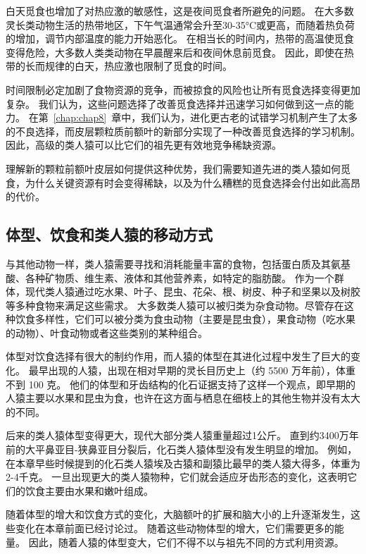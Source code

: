 白天觅食也增加了对热应激的敏感性，这是夜间觅食者所避免的问题。
在大多数灵长类动物生活的热带地区，下午气温通常会升至30-35°C或更高，而随着热负荷的增加，调节内部温度的能力开始恶化。
在相当长的时间内，热带的高温使觅食变得危险，大多数人类类动物在早晨醒来后和夜间休息前觅食\cite{jf1987food}。
因此，即使在热带的长而规律的白天，热应激也限制了觅食的时间。


时间限制必定加剧了食物资源的竞争，而被掠食的风险也让所有觅食选择变得更加复杂。
我们认为，这些问题选择了改善觅食选择并迅速学习如何做到这一点的能力。
在第~\ref{chap:chap8}~章中，我们认为，进化更古老的试错学习机制产生了太多的不良选择，而皮层颗粒质前额叶的新部分实现了一种改善觅食选择的学习机制。
因此，高级的类人猿可以比它们的祖先更有效地竞争稀缺资源。


理解新的颗粒前额叶皮层如何提供这种优势，我们需要知道先进的类人猿如何觅食，为什么关键资源有时会变得稀缺，以及为什么糟糕的觅食选择会付出如此高昂的代价。



\subsection{体型、饮食和类人猿的移动方式}

与其他动物一样，类人猿需要寻找和消耗能量丰富的食物，包括蛋白质及其氨基酸、各种矿物质、维生素、液体和其他营养素，如特定的脂肪酸。
作为一个群体，现代类人猿通过吃水果、叶子、昆虫、花朵、根、树皮、种子和坚果以及树胶等多种食物来满足这些需求。
大多数类人猿可以被归类为杂食动物。尽管存在这种饮食多样性，它们可以被分类为食虫动物（主要是昆虫食），果食动物（吃水果的动物）、叶食动物或者这些类别的某种组合。


体型对饮食选择有很大的制约作用，而人猿的体型在其进化过程中发生了巨大的变化。
最早出现的人猿，出现在相对早期的灵长目历史上（约 5500 万年前），体重不到 100 克。
他们的体型和牙齿结构的化石证据支持了这样一个观点，即早期的人猿主要以水果和昆虫为食\cite{fleagle2013primate,rose2006beginning}，也许在这方面与栖息在细枝上的其他生物并没有太大的不同。


后来的类人猿体型变得更大，现代大部分类人猿重量超过1公斤。
直到约3400万年前的大平鼻亚目-狭鼻亚目分裂后，化石类人猿体型没有发生明显的增加\cite{williams2010new}。
例如，在本章早些时候提到的化石类人猿埃及古猿和副猿比最早的类人猿大得多，体重为2-4千克。
一旦出现更大的类人猿物种，它们就会适应牙齿形态的变化，这表明它们的饮食主要由水果\cite{williams2010new}和嫩叶\cite{kirk2001diets,dominy2004fruits}组成。


随着体型的增大和饮食方式的变化，大脑额叶的扩展和脑大小的上升逐渐发生，这些变化在本章前面已经讨论过。
随着这些动物体型的增大，它们需要更多的能量。
因此，随着人猿的体型变大，它们不得不以与祖先不同的方式利用资源。



